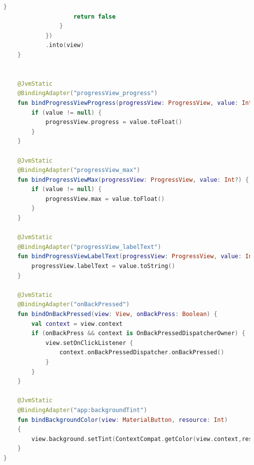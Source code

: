 \documentclass[a4paper, 12pt]{article}
\begin{document}
\begin{lstlisting}[caption={Add New View Adapters on ViewBindings.}, label={code:view_adapters}, language=Kotlin]
                    }
                    return false
                }
            })
            .into(view)
    }


    @JvmStatic
    @BindingAdapter("progressView_progress")
    fun bindProgressViewProgress(progressView: ProgressView, value: Int?) {
        if (value != null) {
            progressView.progress = value.toFloat()
        }
    }

    @JvmStatic
    @BindingAdapter("progressView_max")
    fun bindProgressViewMax(progressView: ProgressView, value: Int?) {
        if (value != null) {
            progressView.max = value.toFloat()
        }
    }

    @JvmStatic
    @BindingAdapter("progressView_labelText")
    fun bindProgressViewLabelText(progressView: ProgressView, value: Int) {
        progressView.labelText = value.toString()
    }

    @JvmStatic
    @BindingAdapter("onBackPressed")
    fun bindOnBackPressed(view: View, onBackPress: Boolean) {
        val context = view.context
        if (onBackPress && context is OnBackPressedDispatcherOwner) {
            view.setOnClickListener {
                context.onBackPressedDispatcher.onBackPressed()
            }
        }
    }

    @JvmStatic
    @BindingAdapter("app:backgroundTint")
    fun bindBackgroundColor(view: MaterialButton, resource: Int)
    {
        view.background.setTint(ContextCompat.getColor(view.context,resource))
    }
}

    

\end{lstlisting}  

\begin{lstlisting}[caption={Pokemon Detail Layout.}, label={layout:pk_detail}, language=XML]


    

\end{lstlisting}  

\begin{lstlisting}[caption={Pokemon Detail Layout.}, label={layout:pk_detail}, language=XML]


    

\end{lstlisting}  
\end{document}
